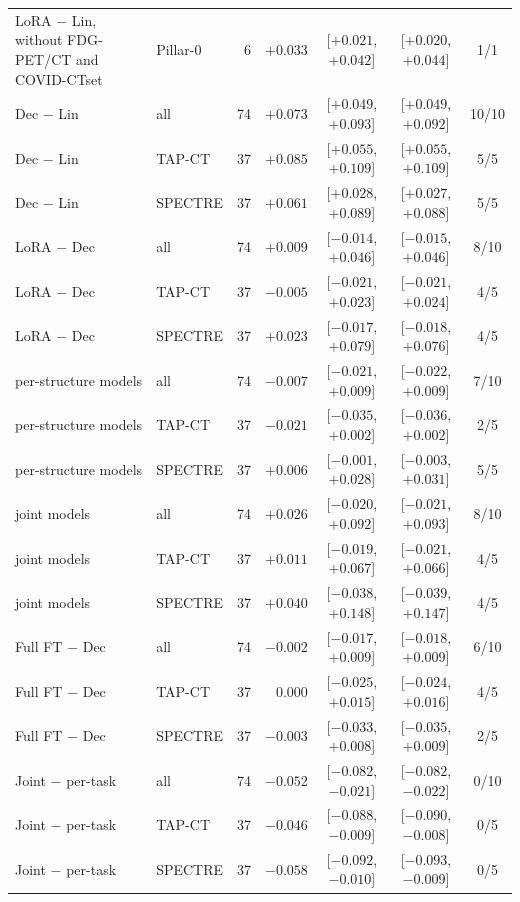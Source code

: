 \begin{tabular}{llrrccc}
LoRA $-$ Lin, without FDG-PET/CT and COVID-CTset & Pillar-0 & 6 & $+0.033$ & [$+0.021$, $+0.042$] & [$+0.020$, $+0.044$] & 1/1 \\
\addlinespace[2pt]
Dec $-$ Lin & all & 74 & $+0.073$ & [$+0.049$, $+0.093$] & [$+0.049$, $+0.092$] & 10/10 \\
Dec $-$ Lin & TAP-CT & 37 & $+0.085$ & [$+0.055$, $+0.109$] & [$+0.055$, $+0.109$] & 5/5 \\
Dec $-$ Lin & SPECTRE & 37 & $+0.061$ & [$+0.028$, $+0.089$] & [$+0.027$, $+0.088$] & 5/5 \\
\addlinespace[2pt]
LoRA $-$ Dec & all & 74 & $+0.009$ & [$-0.014$, $+0.046$] & [$-0.015$, $+0.046$] & 8/10 \\
LoRA $-$ Dec & TAP-CT & 37 & $-0.005$ & [$-0.021$, $+0.023$] & [$-0.021$, $+0.024$] & 4/5 \\
LoRA $-$ Dec & SPECTRE & 37 & $+0.023$ & [$-0.017$, $+0.079$] & [$-0.018$, $+0.076$] & 4/5 \\
\addlinespace[2pt]
\quad per-structure models & all & 74 & $-0.007$ & [$-0.021$, $+0.009$] & [$-0.022$, $+0.009$] & 7/10 \\
\quad per-structure models & TAP-CT & 37 & $-0.021$ & [$-0.035$, $+0.002$] & [$-0.036$, $+0.002$] & 2/5 \\
\quad per-structure models & SPECTRE & 37 & $+0.006$ & [$-0.001$, $+0.028$] & [$-0.003$, $+0.031$] & 5/5 \\
\addlinespace[2pt]
\quad joint models & all & 74 & $+0.026$ & [$-0.020$, $+0.092$] & [$-0.021$, $+0.093$] & 8/10 \\
\quad joint models & TAP-CT & 37 & $+0.011$ & [$-0.019$, $+0.067$] & [$-0.021$, $+0.066$] & 4/5 \\
\quad joint models & SPECTRE & 37 & $+0.040$ & [$-0.038$, $+0.148$] & [$-0.039$, $+0.147$] & 4/5 \\
\addlinespace[2pt]
Full FT $-$ Dec & all & 74 & $-0.002$ & [$-0.017$, $+0.009$] & [$-0.018$, $+0.009$] & 6/10 \\
Full FT $-$ Dec & TAP-CT & 37 & $0.000$ & [$-0.025$, $+0.015$] & [$-0.024$, $+0.016$] & 4/5 \\
Full FT $-$ Dec & SPECTRE & 37 & $-0.003$ & [$-0.033$, $+0.008$] & [$-0.035$, $+0.009$] & 2/5 \\
\addlinespace[2pt]
Joint $-$ per-task & all & 74 & $-0.052$ & [$-0.082$, $-0.021$] & [$-0.082$, $-0.022$] & 0/10 \\
Joint $-$ per-task & TAP-CT & 37 & $-0.046$ & [$-0.088$, $-0.009$] & [$-0.090$, $-0.008$] & 0/5 \\
Joint $-$ per-task & SPECTRE & 37 & $-0.058$ & [$-0.092$, $-0.010$] & [$-0.093$, $-0.009$] & 0/5 \\
\bottomrule
\end{tabular}
